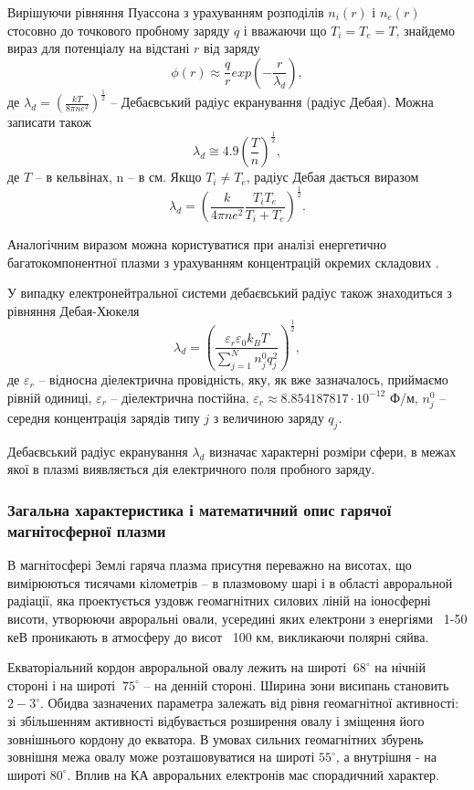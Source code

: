 \documentclass[a4paper,12pt]{article}
\begin{document}
Вирішуючи рівняння Пуассона з урахуванням розподілів $n_i(r)$ і $n_e(r)$ стосовно до точкового пробному заряду $q$ і вважаючи що $T_i = T_e = T$, знайдемо вираз для потенціалу на відстані $r$ від заряду
\[\phi (r) \approx \frac{q}{r}exp \left( - \frac{r}{\lambda_{d}} \right),\]
де $\lambda_{d} = \left( \frac{kT}{8 \pi n e^2} \right)^{\frac{1}{2}}$ -- Дебаєвський радіус екранування (радіус Дебая). Можна записати також
\[\lambda_{d} \cong 4.9 \left( \frac{T}{n} \right)^{\frac{1}{2}},\]
де $T$ -- в кельвінах, n -- в см.
Якщо $T_i \neq T_e$, радіус Дебая дається виразом
\[\lambda_{d} = \left( \frac{k}{4 \pi n e^2} \frac{T_i T_e}{T_i + T_e} \right)^{\frac{1}{2}}.\]

Аналогічним виразом можна користуватися при аналізі енергетично багатокомпонентної плазми з урахуванням концентрацій окремих складових \cite{novikov}.

У випадку електронейтральної системи дебаєвський радіус також знаходиться з рівняння Дебая-Хюкеля
\begin{equation} \label{eq:debye_radius}
\lambda_{d} = \left( \frac{\varepsilon_r \varepsilon_0 k_B T}{\sum \limits_{j=1}^{N}{n_j^0 q_j^2}} \right)^{\frac{1}{2}},
\end{equation}
де $\varepsilon_r$ -- відносна діелектрична провідність, яку, як вже зазначалось, приймаємо рівній одиниці, $\varepsilon_r$ -- діелектрична постійна, $\varepsilon_r \approx 8.854187817 \cdot 10^{-12}$ Ф/м, $n_j^0$ -- середня концентрація зарядів типу $j$ з величиною заряду $q_j$.

Дебаєвський радіус екранування $\lambda_{d}$ визначає характерні розміри сфери, в межах якої в плазмі виявляється дія електричного поля пробного заряду.

\subsubsection{Загальна характеристика і математичний опис гарячої магнітосферної плазми}

В магнітосфері Землі гаряча плазма присутня переважно на висотах, що вимірюються тисячами кілометрів -- в плазмовому шарі і в області авроральной радіації, яка проектується уздовж геомагнітних силових ліній на іоносферні висоти, утворюючи авроральні овали, усередині яких електрони з енергіями ~1-50 кеВ проникають в атмосферу до висот ~100 км, викликаючи полярні сяйва.

Екваторіальний кордон авроральной овалу лежить на широті $~68^{\circ}$ на нічній стороні і на широті $~75^{\circ}$ -- на денній стороні. Ширина зони висипань становить $2-3^{\circ}$. Обидва зазначених параметра залежать від рівня геомагнітної активності: зі збільшенням активності відбувається розширення овалу і зміщення його зовнішнього кордону до екватора. В умовах сильних геомагнітних збурень зовнішня межа овалу може розташовуватися на широті $55^{\circ}$, а внутрішня - на широті $80^{\circ}$. Вплив на КА авроральних електронів має спорадичний характер.
\end{document}
